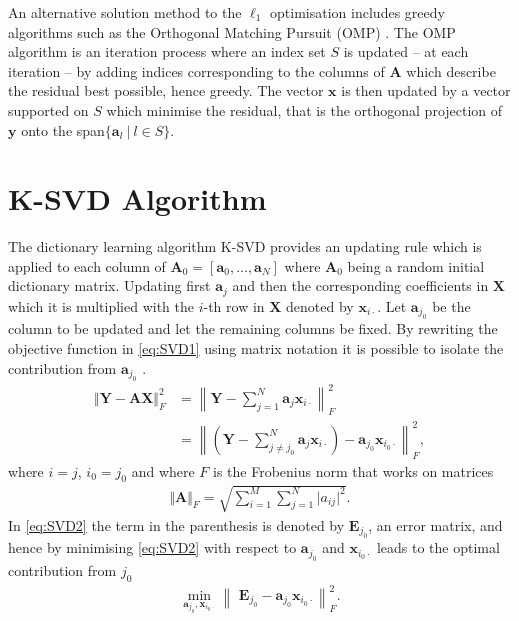 An alternative solution method to the $\ell_1$ optimisation includes greedy algorithms such as the Orthogonal Matching Pursuit (OMP) \cite[P. 65]{FR}. 
The OMP algorithm is an iteration process where an index set $S$ is updated -- at each iteration -- by adding indices corresponding to the columns of $\mathbf{A}$ which describe the residual best possible, hence greedy.
The vector $\mathbf{x}$ is then updated by a vector supported on $S$ which minimise the residual, that is the orthogonal projection of $\mathbf{y}$ onto the span$\lbrace \mathbf{a}_l \ \vert \ l \in S \rbrace$.

\section{K-SVD Algorithm}\label{app_sec:K-SVD_alg}
The dictionary learning algorithm K-SVD provides an updating rule which is applied to each column of $\mathbf{A}_0 = \left[ \mathbf{a}_0, \dots, \mathbf{a}_N \right] $ where $\mathbf{A}_0$ being a random initial dictionary matrix. Updating first $\mathbf{a}_j$ and then the corresponding coefficients in $\mathbf{X}$ which it is multiplied with the $i$-th row in $\mathbf{X}$ denoted by $\mathbf{x}_{i \cdot}$.
Let $\mathbf{a}_{j_{0}}$ be the column to be updated and let the remaining columns be fixed. By rewriting the objective function in \eqref{eq:SVD1} using matrix notation it is possible to isolate the contribution from $\mathbf{a}_{j_{0}}$ .
\begin{align}\label{eq:SVD2} 
\Vert \textbf{Y} - \textbf{AX} \Vert_{F}^{2} 
&= \left\| \textbf{Y} - \sum_{j=1}^{N} \textbf{a}_j \textbf{x}_{i \cdot} \right\|_{F}^{2} \nonumber \\
&= \left\| \left( \textbf{Y}- \sum_{j \neq j_0}^{N} \textbf{a}_j \textbf{x}_{i \cdot} \right) - \textbf{a}_{j_{0}} \textbf{x}_{i_0 \cdot} \right\| _{F}^{2},
\end{align}
where $i = j$, $i_0 = j_0$ and where $F$ is the Frobenius norm that works on matrices
\begin{align*}
\Vert \mathbf{A} \Vert_F = \sqrt{\sum_{i=1}^M \sum_{j=1}^N \vert a_{ij} \vert^2}.
\end{align*} 
In \eqref{eq:SVD2} the term in the parenthesis is denoted by $\textbf{E}_{j_0}$, an error matrix, and hence by minimising \eqref{eq:SVD2} with respect to $\mathbf{a}_{j_0}$ and $\mathbf{x}_{i_0 \cdot}$ leads to the optimal contribution from $j_0$
\begin{align}\label{eq:SVD3}
\min_{\textbf{a}_{j_{0}}, \textbf{x}_{i_0 \cdot}}\left\|\textbf{ E}_{j_{0}} - \textbf{a}_{j_{0}} \textbf{x}_{i_0 \cdot} \right\|_{F}^{2}.
\end{align} 

